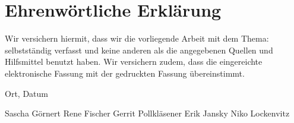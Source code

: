 
\clearpage
\chapter*{Ehrenwörtliche Erklärung}

Wir versichern hiermit, dass wir die vorliegende Arbeit
 mit dem Thema: \textit{\DerTitelDerArbeit} selbstständig verfasst und keine anderen als die angegebenen Quellen und
Hilfsmittel benutzt haben. Wir versichern zudem,
dass die eingereichte elektronische Fassung mit der gedruckten Fassung übereinstimmt.

\vspace{2cm}
Ort, Datum

\vspace{1cm}
Sascha Görnert
\hfill Rene Fischer
\hfill Gerrit Pollkläsener
\hfill Erik Jansky
\hfill Niko Lockenvitz